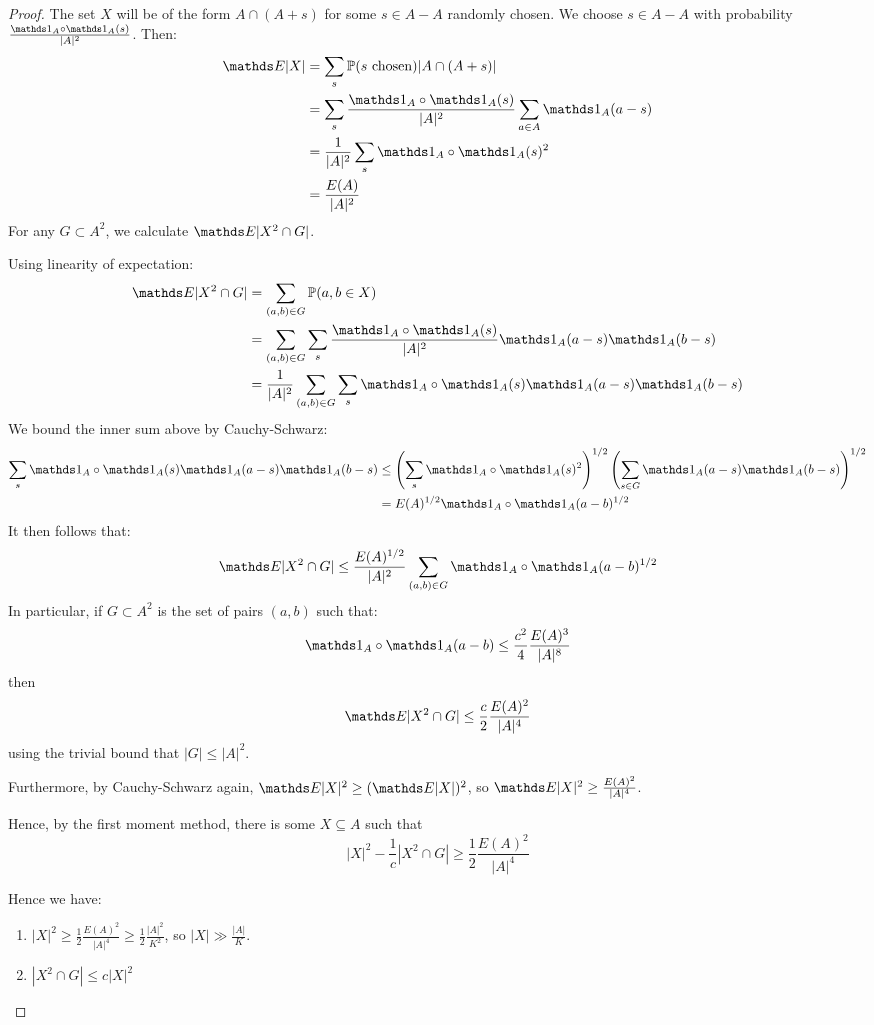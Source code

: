 \documentclass[10pt,a4paper]{article}
\begin{document}
\begin{proof}
  The set $X$ will be of the form $A \cap (A+s)$ for some $s \in A-A$ randomly chosen. We choose $s \in A-A$ with probability $\frac{\one_A \circ \one_A(s)}{|A|^2}$. Then:
  \begin{align*}
    \E |X| &= \sum_s \P(s \text{ chosen})|A \cap (A+s)|\\
    &= \sum_s \frac{\one_A\circ \one_A(s)}{|A|^2}\sum_{a \in A}\one_A(a-s)\\
    &= \frac{1}{|A|^2}\sum_s \one_A \circ \one_A(s)^2\\
    &= \frac{E(A)}{|A|^2}
  \end{align*}
  For any $G \subset A^2$, we calculate $\E |X^2 \cap G|$.

  Using linearity of expectation:
  \begin{align*}
    \E |X^2 \cap G| &= \sum_{(a,b) \in G} \P(a,b \in X)\\
    &= \sum_{(a,b) \in G}\sum_s \frac{\one_A\circ \one_A(s)}{|A|^2}\one_A(a-s)\one_A(b-s)\\
    &= \frac{1}{|A|^2}\sum_{(a,b) \in G} \sum_s \one_A \circ \one_A(s)\one_A(a-s)\one_A(b-s)
  \end{align*}
  We bound the inner sum above by Cauchy-Schwarz:
  \begin{align*}
    \sum_s \one_A \circ \one_A(s) \one_A(a-s)\one_A(b-s) & \leq \left(\sum_s \one_A\circ \one_A(s)^2\right)^{1/2}\left(\sum_{s\in G} \one_A(a-s)\one_A(b-s)\right)^{1/2}\\
    &= E(A)^{1/2}\one_A\circ \one_A(a-b)^{1/2}
  \end{align*}
  It then follows that:
  \[\E|X^2\cap G| \leq \frac{E(A)^{1/2}}{|A|^2} \sum_{(a,b)\in G} \one_A \circ \one_A(a-b)^{1/2}\]
  In particular, if $G \subset A^2$ is the set of pairs $(a,b)$ such that:
  \[\one_A \circ \one_A(a-b) \leq \frac{c^2}{4}\frac{E(A)^3}{|A|^8}\]
  then
  \[\E|X^2 \cap G| \leq \frac{c}{2}\frac{E(A)^2}{|A|^4}\]
  using the trivial bound that $|G| \leq |A|^2$.

  Furthermore, by Cauchy-Schwarz again, $\E |X|^2 \geq (\E |X|)^2$, so $\E|X|^2 \geq \frac{E(A)^2}{|A|^4}$.

  Hence, by the first moment method, there is some $X \subseteq A$ such that
  \[|X|^2 -\frac{1}{c}|X^2 \cap G| \geq \frac{1}{2}\frac{E(A)^2}{|A|^4}\]

  Hence we have:
  \begin{enumerate}
    \item $|X|^2 \geq \frac12 \frac{E(A)^2}{|A|^4} \geq \frac12 \frac{|A|^2}{K^2}$, so $|X| \gg \frac{|A|}{K}$.
    \item $|X^2 \cap G| \leq c|X|^2$
  \end{enumerate}
\end{proof}
\end{document}
